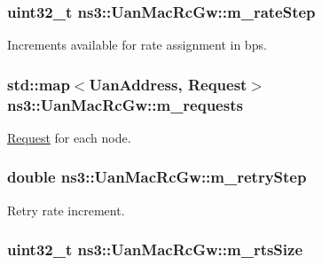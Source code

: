 \subsubsection[{\texorpdfstring{m\+\_\+rate\+Step}{m_rateStep}}]{\setlength{\rightskip}{0pt plus 5cm}uint32\+\_\+t ns3\+::\+Uan\+Mac\+Rc\+Gw\+::m\+\_\+rate\+Step\hspace{0.3cm}{\ttfamily [private]}}\hypertarget{classns3_1_1UanMacRcGw_a358dc1512c2e94359c1892eae090f7e1}{}\label{classns3_1_1UanMacRcGw_a358dc1512c2e94359c1892eae090f7e1}


Increments available for rate assignment in bps. 

\subsubsection[{\texorpdfstring{m\+\_\+requests}{m_requests}}]{\setlength{\rightskip}{0pt plus 5cm}std\+::map$<${\bf Uan\+Address}, {\bf Request}$>$ ns3\+::\+Uan\+Mac\+Rc\+Gw\+::m\+\_\+requests\hspace{0.3cm}{\ttfamily [private]}}\hypertarget{classns3_1_1UanMacRcGw_ace02d765d83abd8ea6513fd7813626e0}{}\label{classns3_1_1UanMacRcGw_ace02d765d83abd8ea6513fd7813626e0}
\hyperlink{structns3_1_1UanMacRcGw_1_1Request}{Request} for each node. 
\subsubsection[{\texorpdfstring{m\+\_\+retry\+Step}{m_retryStep}}]{\setlength{\rightskip}{0pt plus 5cm}double ns3\+::\+Uan\+Mac\+Rc\+Gw\+::m\+\_\+retry\+Step\hspace{0.3cm}{\ttfamily [private]}}\hypertarget{classns3_1_1UanMacRcGw_add3041a7bf45e5d81fff4600ba20caf6}{}\label{classns3_1_1UanMacRcGw_add3041a7bf45e5d81fff4600ba20caf6}


Retry rate increment. 

\subsubsection[{\texorpdfstring{m\+\_\+rts\+Size}{m_rtsSize}}]{\setlength{\rightskip}{0pt plus 5cm}uint32\+\_\+t ns3\+::\+Uan\+Mac\+Rc\+Gw\+::m\+\_\+rts\+Size\hspace{0.3cm}{\ttfamily [private]}}\hypertarget{classns3_1_1UanMacRcGw_abc2eb00f1a5cbc9cf96fdaf637a20e38}{}\label{classns3_1_1UanMacRcGw_abc2eb00f1a5cbc9cf96fdaf637a20e38}


